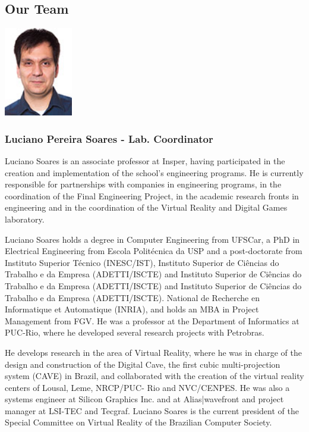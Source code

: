\subsection{Our Team}
\setlength{\columnsep}{-10cm}
\begin{multicols}{2}
\includegraphics[width=3cm]{imgs/luciano-soares.jpg}
\columnbreak
\subsubsection{Luciano Pereira Soares - Lab. Coordinator}

Luciano Soares is an associate professor at Insper, having participated in the creation and implementation of the school's engineering programs. He is currently responsible for partnerships with companies in engineering programs, in the coordination of the Final Engineering Project, in the academic research fronts in engineering and in the coordination of the Virtual Reality and Digital Games laboratory.

Luciano Soares holds a degree in Computer Engineering from UFSCar, a PhD in Electrical Engineering from Escola Politécnica da USP and a post-doctorate from Instituto Superior Técnico (INESC/IST), Instituto Superior de Ciências do Trabalho e da Empresa (ADETTI/ISCTE) and Instituto Superior de Ciências do Trabalho e da Empresa (ADETTI/ISCTE) and Instituto Superior de Ciências do Trabalho e da Empresa (ADETTI/ISCTE). National de Recherche en Informatique et Automatique (INRIA), and holds an MBA in Project Management from FGV. He was a professor at the Department of Informatics at PUC-Rio, where he developed several research projects with Petrobras.

He develops research in the area of ​​Virtual Reality, where he was in charge of the design and construction of the Digital Cave, the first cubic multi-projection system (CAVE) in Brazil, and collaborated with the creation of the virtual reality centers of Lousal, Leme, NRCP/PUC- Rio and NVC/CENPES. He was also a systems engineer at Silicon Graphics Inc. and at Alias|wavefront and project manager at LSI-TEC and Tecgraf. Luciano Soares is the current president of the Special Committee on Virtual Reality of the Brazilian Computer Society.

\end{multicols}

